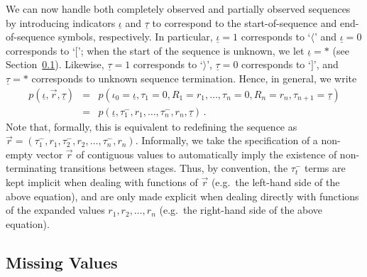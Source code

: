 \documentclass[a4paper]{article}
\newcommand{\ui}{\underline{\iota}}
\newcommand{\ut}{\underline{\tau}}
\newcommand{\vr}{\vec{r}}
\newcommand{\tm}{\tau^{-}}
\begin{document}
We can now handle both completely observed and partially observed sequences by introducing indicators $\ui$ and $\ut$
to correspond to the start-of-sequence and end-of-sequence symbols, respectively.
In particular, $\ui=1$ corresponds to `$\langle$' and $\ui=0$ corresponds to `$[$'; when the start of the sequence is unknown,
we let $\ui=*$ (see Section~\ref{sec:missing-values}). Likewise, $\ut=1$ corresponds to `$\rangle$', $\ut=0$ corresponds to `$]$', and
$\ut=*$ corresponds to unknown sequence termination.
Hence, in general, we write
\begin{eqnarray}
p(\ui,\vr,\ut)
& = & p(\iota_0\!=\!\ui,\tau_1\!=\!0,R_1\!=\!r_1,\ldots,\tau_n\!=\!0,R_n\!=\!r_n,\tau_{n+1}\!=\!\ut)
\nonumber\\
& = & p(\ui,\tm_1,r_1,\ldots,\tm_n,r_n,\ut)\,.
\label{eq:pr:gen}
\end{eqnarray}
Note that, formally, this is equivalent to redefining the sequence
as $\vr=(\tm_1,r_1,\tm_2,r_2,\ldots,\tm_n,r_n)$.
Informally, we take the specification of a non-empty vector $\vr$ of contiguous values to automatically imply the existence of non-terminating
transitions between stages. Thus, by convention, the $\tm_t$ terms are kept implicit when dealing with functions of $\vr$
(e.g.\ the left-hand side of the above equation),
and are only made explicit when dealing directly with functions of the expanded values $r_1, r_2, \ldots, r_n$
(e.g.\ the right-hand side of the above equation).

\subsection{Missing Values}\label{sec:missing-values}
\end{document}
